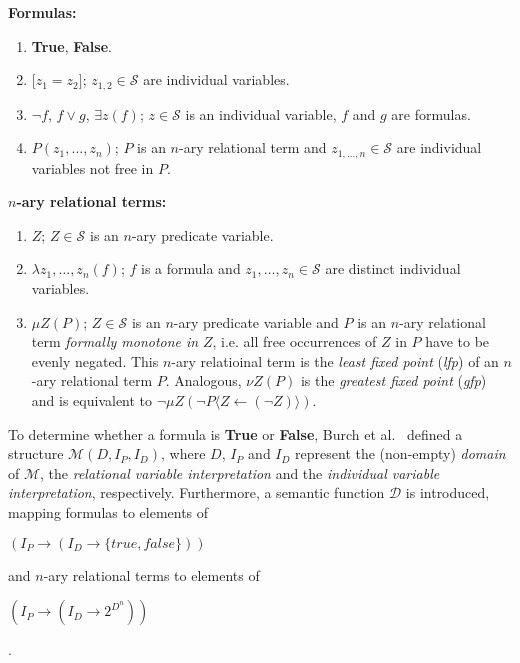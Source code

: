 \documentclass{vldb}
\begin{document}
\noindent
\textbf{Formulas:}~\cite{BURCH90}
\begin{enumerate}
    \item{\textbf{True}, \textbf{False}}.
    \item{
        $\lbrack z_1 = z_2 \rbrack$; $z_{1, 2}\in\mathcal{S}$ are individual
        variables.
    }
    \item{
        $\neg f$, $f \lor g$, $\exists z\left( f \right)$; $z\in\mathcal{S}$ is
        an individual variable, $f$ and $g$ are formulas.
    }
    \item{
        $P\left(z_1, \ldots, z_n\right)$; $P$ is an $n$-ary relational term and
        \newline $z_{1, \ldots, n}\in\mathcal{S}$ are individual variables not
        free in $P$.
    }
\end{enumerate}
\textbf{$n$-ary relational terms:}~\cite{BURCH90}
\begin{enumerate}
    \item{$Z$; $Z\in\mathcal{S}$ is an $n$-ary predicate variable.}
    \item{
        $\lambda z_1, \ldots, z_n\left( f \right)$; $f$ is a formula and
        $z_1, \ldots, z_n\in\mathcal{S}$ are distinct individual variables.
    }
    \item{
        $\mu Z \left( P \right)$; $Z\in\mathcal{S}$ is an $n$-ary predicate variable
        and $P$ is an $n$-ary relational term \textit{formally monotone in} $Z$,
        i.e. all free occurrences of $Z$ in $P$ have to be evenly negated. This
        $n$-ary relatioinal term is the \textit{least fixed point} (\textit{lfp})
        of an $n$-ary relational term $P$. Analogous, $\nu Z \left( P \right)$ is
        the \textit{greatest fixed point} (\textit{gfp}) and is equivalent to
        $\neg\mu Z \left( \neg P \langle Z \leftarrow \left( \neg Z \right) \rangle \right)$.
    }
\end{enumerate}

To determine whether a formula is \textbf{True} or \textbf{False}, Burch et
al.~\cite{BURCH90} defined a structure $\mathcal{M}\left( D, I_P, I_D \right)$,
where $D$, $I_P$ and $I_D$ represent the (non-empty) \textit{domain} of
$\mathcal{M}$, the \textit{relational variable interpretation} and the
\textit{individual variable interpretation}, respectively. Furthermore, a semantic
function $\mathcal{D}$ is introduced, mapping formulas to elements of
\begin{center}
$\left( I_P \rightarrow \left( I_D \rightarrow \lbrace true, false \rbrace \right) \right)$
\end{center}
and $n$-ary relational terms to elements of
\begin{center}
$\left( I_P \rightarrow \left( I_D \rightarrow 2^{D^n} \right) \right)$
\end{center}.
\end{document}
